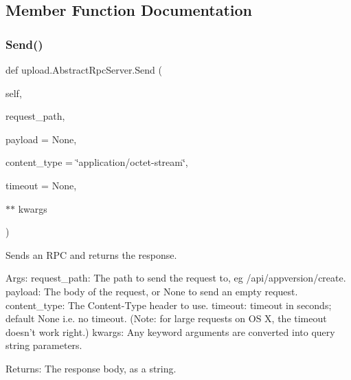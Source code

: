 \subsection{Member Function Documentation}
\mbox{\label{classupload_1_1AbstractRpcServer_ad6555ae8993a52035191f8572762e741}} 
\subsubsection{\texorpdfstring{Send()}{Send()}\hspace{0.1cm}{\footnotesize\ttfamily [1/2]}}
{\footnotesize\ttfamily def upload.\+Abstract\+Rpc\+Server.\+Send (\begin{DoxyParamCaption}\item[{}]{self,  }\item[{}]{request\+\_\+path,  }\item[{}]{payload = {\ttfamily None},  }\item[{}]{content\+\_\+type = {\ttfamily \char`\"{}application/octet-\/stream\char`\"{}},  }\item[{}]{timeout = {\ttfamily None},  }\item[{$\ast$$\ast$}]{kwargs }\end{DoxyParamCaption})}

\begin{DoxyVerb}Sends an RPC and returns the response.

Args:
  request_path: The path to send the request to, eg /api/appversion/create.
  payload: The body of the request, or None to send an empty request.
  content_type: The Content-Type header to use.
  timeout: timeout in seconds; default None i.e. no timeout.
(Note: for large requests on OS X, the timeout doesn't work right.)
  kwargs: Any keyword arguments are converted into query string parameters.

Returns:
  The response body, as a string.
\end{DoxyVerb}
 \mbox{\label{classupload_1_1AbstractRpcServer_ad6555ae8993a52035191f8572762e741}} 
